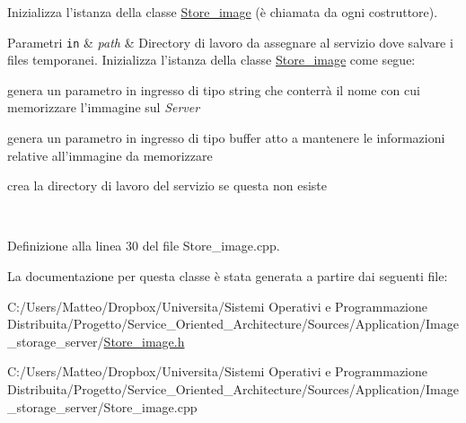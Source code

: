 Inizializza l'istanza della classe \hyperlink{class_store__image}{Store\-\_\-image} (è chiamata da ogni costruttore). 


\begin{DoxyParams}[1]{Parametri}
\mbox{\tt in}  & {\em path} & Directory di lavoro da assegnare al servizio dove salvare i files temporanei. Inizializza l'istanza della classe \hyperlink{class_store__image}{Store\-\_\-image} come segue\-: \begin{DoxyItemize}
\item genera un parametro in ingresso di tipo {\ttfamily string} che conterrà il nome con cui memorizzare l'immagine sul {\itshape Server} \item genera un parametro in ingresso di tipo {\ttfamily buffer} atto a mantenere le informazioni relative all'immagine da memorizzare \item crea la directory di lavoro del servizio se questa non esiste \end{DoxyItemize}
\\
\hline
\end{DoxyParams}


Definizione alla linea 30 del file Store\-\_\-image.\-cpp.



La documentazione per questa classe è stata generata a partire dai seguenti file\-:\begin{DoxyCompactItemize}
\item 
C\-:/\-Users/\-Matteo/\-Dropbox/\-Universita/\-Sistemi Operativi e Programmazione Distribuita/\-Progetto/\-Service\-\_\-\-Oriented\-\_\-\-Architecture/\-Sources/\-Application/\-Image\-\_\-storage\-\_\-server/\hyperlink{_store__image_8h}{Store\-\_\-image.\-h}\item 
C\-:/\-Users/\-Matteo/\-Dropbox/\-Universita/\-Sistemi Operativi e Programmazione Distribuita/\-Progetto/\-Service\-\_\-\-Oriented\-\_\-\-Architecture/\-Sources/\-Application/\-Image\-\_\-storage\-\_\-server/Store\-\_\-image.\-cpp\end{DoxyCompactItemize}
